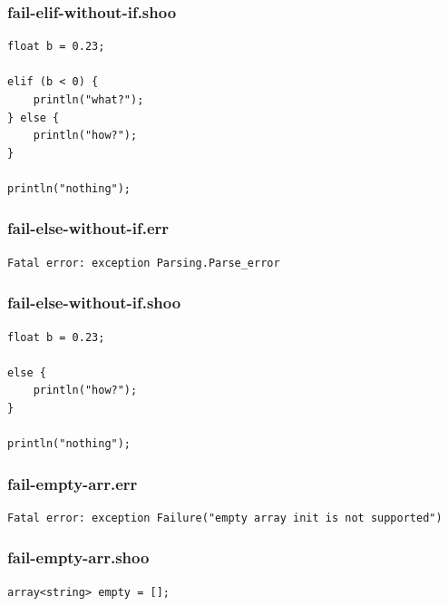 \documentclass[12pt]{article}
\begin{document}
\subsubsection{fail-elif-without-if.shoo}
\begin{mdframed}[hidealllines=true,backgroundcolor=blue!10]
\begin{lstlisting}
float b = 0.23;

elif (b < 0) {
    println("what?");
} else {
    println("how?");
}

println("nothing");
\end{lstlisting}
\end{mdframed}
\subsubsection{fail-else-without-if.err}
\begin{mdframed}[hidealllines=true,backgroundcolor=green!10]
\begin{lstlisting}
Fatal error: exception Parsing.Parse_error
\end{lstlisting}
\end{mdframed}
\subsubsection{fail-else-without-if.shoo}
\begin{mdframed}[hidealllines=true,backgroundcolor=blue!10]
\begin{lstlisting}
float b = 0.23;

else {
    println("how?");
}

println("nothing");
\end{lstlisting}
\end{mdframed}
\subsubsection{fail-empty-arr.err}
\begin{mdframed}[hidealllines=true,backgroundcolor=green!10]
\begin{lstlisting}
Fatal error: exception Failure("empty array init is not supported")\end{lstlisting}
\end{mdframed}
\subsubsection{fail-empty-arr.shoo}
\begin{mdframed}[hidealllines=true,backgroundcolor=blue!10]
\begin{lstlisting}
array<string> empty = [];\end{lstlisting}
\end{mdframed}
\end{document}
